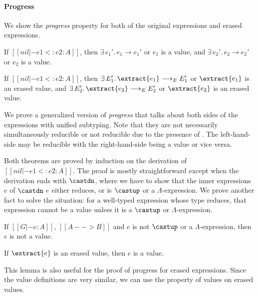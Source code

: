 \paragraph{Progress} We show the \emph{progress} property for both of
the original expressions and erased expressions.

\begin{theorem}
    If $[[nil |- e1 <: e2 : A]]$,
    then $\exists \, e_1'. \, e_1 \longrightarrow e_1'$ or $e_1$ is a value,
    and $\exists \, e_2'. \, e_2 \longrightarrow e_2'$ or $e_2$ is a value.
\end{theorem}

\begin{theorem}
    If $[[nil |- e1 <: e2 : A]]$,
    then $\exists \, E_1'. \, \extract{e_1} \longrightarrow_E E_1'$ or $\extract{e_1}$ is an erased value,
    and $\exists \, E_2'. \, \extract{e_2} \longrightarrow_E E_2'$ or $\extract{e_2}$ is an erased value.
\end{theorem}

\noindent We prove a generalized version of \emph{progress} that talks about both sides
of the expressions with unified subtyping. Note that they are not necessarily
simultaneously reducible or not reducible due to the presence of .
The left-hand-side may be reducible with the right-hand-side being a value or vice versa.

Both theorems are proved by induction on the derivation of $[[nil |- e1 <: e2 : A]]$.
The proof is mostly straightforward except when the derivation ends with $\castdn$,
where we have to show that the inner expressions $e$ of $\castdn~e$ either reduces, or
is $\castup$ or a $\Lambda$-expression. We prove another fact to solve the situation:
for a well-typed expression whose type reduces, that expression
cannot be a value unless it is a $\castup$ or $\Lambda$-expression.

\begin{lemma}
    If $[[G |- e : A]]$, $[[A --> B]]$ and $e$ is not $\castup$ or a $\Lambda$-expression,
    then $e$ is not a value.
\end{lemma}

\begin{lemma}
    If $\extract{e}$ is an erased value, then $e$ is a value.
\end{lemma}

This lemma is also useful for the proof of progress for erased expressions.
Since the value definitions are very similar, we can use the property of values
on erased values.

